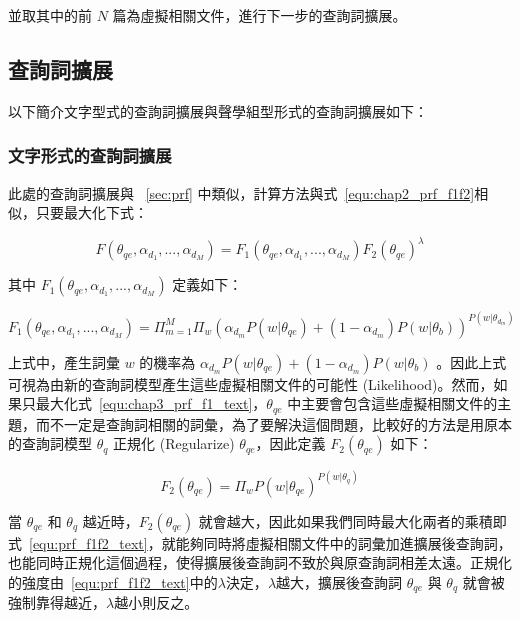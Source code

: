 並取其中的前 $N$ 篇為虛擬相關文件，進行下一步的查詢詞擴展。

\subsection{查詢詞擴展}
以下簡介文字型式的查詢詞擴展與聲學組型形式的查詢詞擴展如下：

\subsubsection{文字形式的查詢詞擴展}
此處的查詢詞擴展與 ~\ref{sec:prf} 中類似，計算方法與式~\ref{equ:chap2_prf_f1f2}相似，只要最大化下式：

\begin{equation}
\label{equ:prf_f1f2_text}
F(\theta_{qe}, \alpha_{d_1}, ..., \alpha_{d_M}) = F_1(\theta_{qe}, \alpha_{d_1}, ..., \alpha_{d_M}) F_2(\theta_{qe})^\lambda
\end{equation}

其中 $F_1(\theta_{qe}, \alpha_{d_1}, ..., \alpha_{d_M})$ 定義如下：

\begin{equation}
\label{equ:chap3_prf_f1_text}
F_1(\theta_{qe}, \alpha_{d_1}, ..., \alpha_{d_M}) = \Pi^M_{m=1} \Pi_w (\alpha_{d_m} P(w|\theta_{qe}) + (1 - \alpha_{d_m}) P(w|\theta_b))^{P(w|\theta_{d_m})}
\end{equation}

上式中，產生詞彙 $w$ 的機率為 $\alpha_{d_m} P(w|\theta_{qe}) + (1-\alpha_{d_m}) P(w|\theta_b)$ 。因此上式可視為由新的查詢詞模型產生這些虛擬相關文件的可能性 (Likelihood)。然而，如果只最大化式~\ref{equ:chap3_prf_f1_text}，$\theta_{qe}$ 中主要會包含這些虛擬相關文件的主題，而不一定是查詢詞相關的詞彙，為了要解決這個問題，比較好的方法是用原本的查詢詞模型 $\theta_q$ 正規化 (Regularize) $\theta_{qe}$，因此定義 $F_2(\theta_{qe})$ 如下：

\begin{equation}
\label{equ:chap3_prf_f2_text}
F_2(\theta_{qe}) = \Pi_w P(w|\theta_{qe})^{P(w|\theta_q)}
\end{equation}

當 $\theta_{qe}$ 和 $\theta_q$ 越近時，$F_2(\theta_{qe})$ 就會越大，因此如果我們同時最大化兩者的乘積即式~\ref{equ:prf_f1f2_text}，就能夠同時將虛擬相關文件中的詞彙加進擴展後查詢詞，也能同時正規化這個過程，使得擴展後查詢詞不致於與原查詢詞相差太遠。正規化的強度由~\ref{equ:prf_f1f2_text}中的$\lambda$決定，$\lambda$越大，擴展後查詢詞 $\theta_{qe}$ 與 $\theta_q$ 就會被強制靠得越近，$\lambda$越小則反之。

